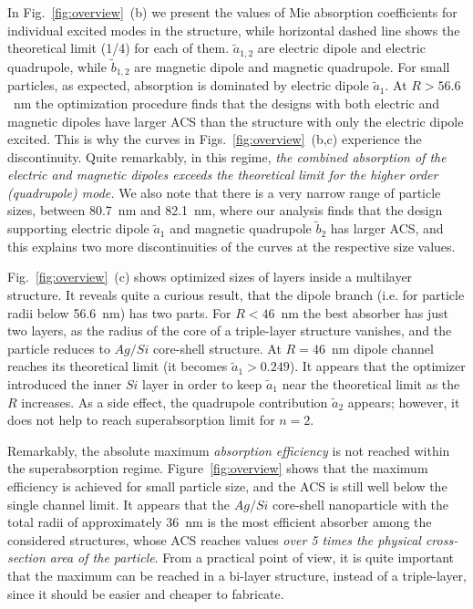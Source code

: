 \documentclass[aps,prl,twocolumn,showpacs,superscriptaddress,groupedaddress]{revtex4-1}  %
\begin{document}
In Fig.~\ref{fig:overview}~(b) we present the values of Mie absorption
coefficients for individual excited modes in the structure, while
horizontal dashed line shows the theoretical limit (1/4) for each of
them. $\tilde{a}_{1,2}$ are electric dipole and electric quadrupole,
while $\tilde{b}_{1,2}$ are magnetic dipole and magnetic
quadrupole. For small particles, as expected, absorption is dominated
by electric dipole $\tilde{a}_1$.  At $R > 56.6$~nm the optimization
procedure finds that the designs with both electric and magnetic
dipoles have larger ACS than the structure with only the electric
dipole excited. This is why the curves in
Figs.~\ref{fig:overview}~(b,c) experience the discontinuity. Quite
remarkably, in this regime, {\em the combined absorption of the
  electric and magnetic dipoles exceeds the theoretical limit for the
  higher order (quadrupole) mode.}  We also note that there is a very
narrow range of particle sizes, between 80.7~nm and 82.1~nm, where our
analysis finds that the design supporting electric dipole
$\tilde{a}_1$ and magnetic quadrupole $\tilde{b}_2$ has larger ACS,
and this explains two more discontinuities of the curves at the
respective size values.

Fig.~\ref{fig:overview}~(c) shows optimized sizes of layers inside a
multilayer structure. It reveals quite a curious result, that the
dipole branch (i.e. for particle radii below 56.6~nm) has two
parts. For $R<46$~nm the best absorber has just two layers, as the
radius of the core of a triple-layer structure vanishes, and the
particle reduces to $Ag/Si$ core-shell structure.  At $R=46$~nm dipole
channel reaches its theoretical limit (it becomes
$\tilde{a}_1>0.249$).  It appears that the optimizer introduced the
inner $Si$ layer in order to keep $\tilde{a}_1$ near the theoretical
limit as the $R$ increases.  As a side effect, the quadrupole
contribution $\tilde{a}_2$ appears; however, it does not help to reach
superabsorption limit for $n=2$.

Remarkably, the absolute maximum {\em absorption efficiency} is not
reached within the superabsorption regime. Figure~\ref{fig:overview}
shows that the maximum efficiency is achieved for small particle size,
and the ACS is still well below the single channel limit. It appears
that the $Ag/Si$ core-shell nanoparticle with the total radii of
approximately 36~nm is the most efficient absorber among the
considered structures, whose ACS reaches values {\em over 5 times the
  physical cross-section area of the particle}.  From a practical
point of view, it is quite important that the maximum can be reached
in a bi-layer structure, instead of a triple-layer, since it should be
easier and cheaper to fabricate.
\end{document}
